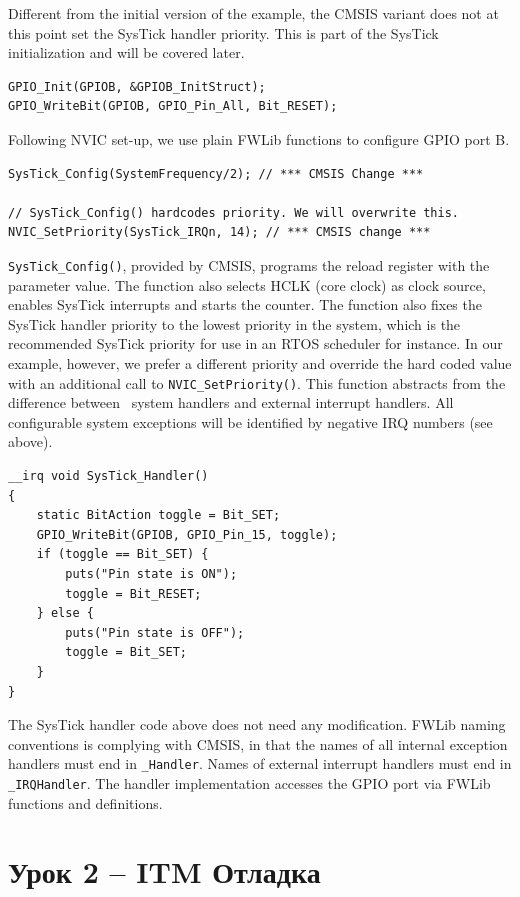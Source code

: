 Different from the initial version of the example, the CMSIS variant does not at
this point set the SysTick handler priority. This is part of the SysTick
initialization and will be covered later.

\begin{lstlisting}[style=cpp]
GPIO_Init(GPIOB, &GPIOB_InitStruct);
GPIO_WriteBit(GPIOB, GPIO_Pin_All, Bit_RESET);
\end{lstlisting}

Following NVIC set-up, we use plain FWLib functions to configure GPIO port B.

\begin{lstlisting}[style=cpp]
SysTick_Config(SystemFrequency/2); // *** CMSIS Change ***

// SysTick_Config() hardcodes priority. We will overwrite this.
NVIC_SetPriority(SysTick_IRQn, 14); // *** CMSIS change ***
\end{lstlisting}

\verb|SysTick_Config()|, provided by CMSIS, programs the reload register with
the parameter value. The function also selects HCLK (core clock) as clock
source, enables SysTick interrupts and starts the counter. The function also
fixes the SysTick handler priority to the lowest priority in the system, which
is the recommended SysTick priority for use in an RTOS scheduler for instance.
In our example, however, we prefer a different priority and override the hard
coded value with an additional call to \verb|NVIC_SetPriority()|. This function
abstracts from the difference between \ system handlers and external
interrupt handlers. All configurable system exceptions will be identified by
negative IRQ numbers (see above).

\begin{lstlisting}[style=cpp]
__irq void SysTick_Handler()
{
	static BitAction toggle = Bit_SET;
	GPIO_WriteBit(GPIOB, GPIO_Pin_15, toggle);
	if (toggle == Bit_SET) {
		puts("Pin state is ON");
		toggle = Bit_RESET;
	} else {
		puts("Pin state is OFF");
		toggle = Bit_SET;
	}
}
\end{lstlisting}

The SysTick handler code above does not need any modification. FWLib naming
conventions is complying with CMSIS, in that the names of all internal exception
handlers must end in \verb|_Handler|. Names of external interrupt handlers must
end in \verb|_IRQHandler|. The handler implementation accesses the GPIO port via
FWLib functions and definitions.

\section{Урок 2 – ITM Отладка}

